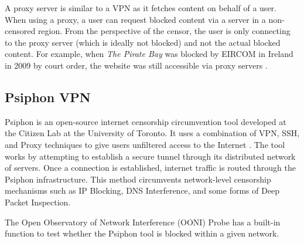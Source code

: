 A proxy server is similar to a VPN as it fetches content on behalf of a user. When using a proxy, a user can request blocked content via a server in a non-censored region. From the perspective of the censor, the user is only connecting to the proxy server (which is ideally not blocked) and not the actual blocked content. For example, when \textit{The Pirate Bay} was blocked by EIRCOM in Ireland in 2009 by court order, the website was still accessible via proxy servers \cite{PirateBayBlocked2009}.

\subsection{Psiphon VPN}

Psiphon is an open-source internet censorship circumvention tool developed at the Citizen Lab at the University of Toronto. It uses a combination of VPN, SSH, and Proxy techniques to give users unfiltered access to the Internet \cite{ooniPsiphonTest}. The tool works by attempting to establish a secure tunnel through its distributed network of servers. Once a connection is established, internet traffic is routed through the Psiphon infrastructure. This method circumvents network-level censorship mechanisms such as IP Blocking, DNS Interference, and some forms of Deep Packet Inspection. 

The Open Observatory of Network Interference (OONI) Probe has a built-in function to test whether the Psiphon tool is blocked within a given network.